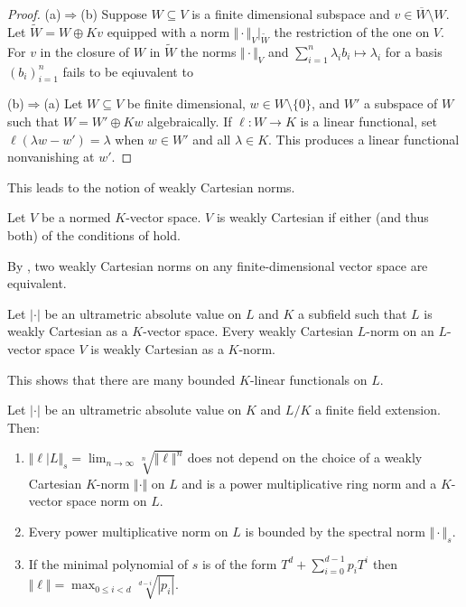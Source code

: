 \begin{proof}
   (a)$\Rightarrow$(b) Suppose $W\subseteq V$ is a finite dimensional subspace and $v\in\overline{W}\setminus W$. Let $\widetilde{W}=W\oplus Kv$ equipped with a norm $\Vert \cdot\Vert_{V}|_{\widetilde{W}}$ the restriction of the one on $V$. For $v$ in the closure of $W$ in $\widetilde{W}$ the norms $\Vert\cdot\Vert_{V}$ and $\sum_{i=1}^{n}\lambda_{i}b_{i}\mapsto \lambda_{i}$ for a basis $(b_{i})_{i=1}^{n}$ fails to be eqiuvalent to 

   (b)$\Rightarrow$(a) Let $W\subseteq V$ be finite dimensional, $w\in W\setminus\{0\}$, and $W'$ a subspace of $W$ such that $W=W'\oplus K w$ algebraically. If $\ell:W\to K$ is a linear functional, set $\ell(\lambda w-w')=\lambda$ when $w\in W'$ and all $\lambda\in K$. This produces a linear functional nonvanishing at $w'$. 
\end{proof}
This leads to the notion of weakly Cartesian norms. 
\begin{definition}\label{def: weakly Cartesian norm}
    Let $V$ be a normed $K$-vector space. $V$ is weakly Cartesian if either (and thus both) of the conditions of  hold. 
\end{definition}
\begin{remark}
    By , two weakly Cartesian norms on any finite-dimensional vector space are equivalent. 
\end{remark}
\begin{lemma}\label{lem: weakly cartesian as K-norm}
    Let $|\cdot|$ be an ultrametric absolute value on $L$ and $K$ a subfield such that $L$ is weakly Cartesian as a $K$-vector space. Every weakly Cartesian $L$-norm on an $L$-vector space $V$ is weakly Cartesian as a $K$-norm. 
\end{lemma}
This shows that there are many bounded $K$-linear functionals on $L$. 
\begin{proposition}\label{prop: spectral norm}
    Let $|\cdot|$ be an ultrametric absolute value on $K$ and $L/K$ a finite field extension. Then: 
    \begin{enumerate}[label=(\roman*)]
        \item $\Vert\ell|L\Vert_{s}=\lim_{n\to\infty}\sqrt[n]{\Vert\ell\Vert^{n}}$ does not depend on the choice of a weakly Cartesian $K$-norm $\Vert\cdot\Vert$ on $L$ and is a power multiplicative ring norm and a $K$-vector space norm on $L$. 
        \item Every power multiplicative norm on $L$ is bounded by the spectral norm $\Vert\cdot\Vert_{s}$. 
        \item If the minimal polynomial of $s$ is of the form $T^{d}+\sum_{i=0}^{d-1}p_{i}T^{i}$ then $\Vert\ell\Vert=\max_{0\leq i<d}\sqrt[d-i]{|p_{i}|}$. 
    \end{enumerate}
\end{proposition}
